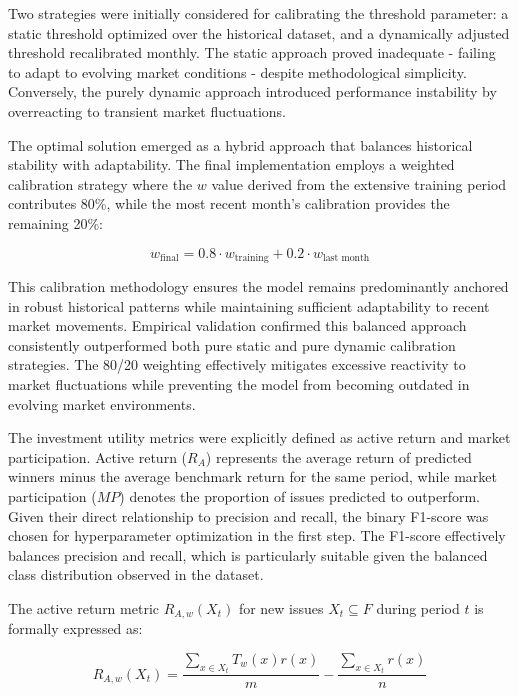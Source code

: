 Two strategies were initially considered for calibrating the threshold parameter: a static threshold optimized over the historical dataset, and a dynamically adjusted threshold recalibrated monthly. The static approach proved inadequate - failing to adapt to evolving market conditions - despite methodological simplicity. Conversely, the purely dynamic approach introduced performance instability by overreacting to transient market fluctuations.

The optimal solution emerged as a hybrid approach that balances historical stability with adaptability. The final implementation employs a weighted calibration strategy where the $w$ value derived from the extensive training period contributes 80\%, while the most recent month's calibration provides the remaining 20\%:

\begin{equation}
\label{eq: weighted_calibration}
w_{\text{final}} = 0.8 \cdot w_{\text{training}} + 0.2 \cdot w_{\text{last month}}
\end{equation}

This calibration methodology ensures the model remains predominantly anchored in robust historical patterns while maintaining sufficient adaptability to recent market movements. Empirical validation confirmed this balanced approach consistently outperformed both pure static and pure dynamic calibration strategies. The 80/20 weighting effectively mitigates excessive reactivity to  market fluctuations while preventing the model from becoming outdated in evolving market environments.

The investment utility metrics were explicitly defined as active return and market participation. Active return ($R_A$) represents the average return of predicted winners minus the average benchmark return for the same period, while market participation ($MP$) denotes the proportion of issues predicted to outperform. Given their direct relationship to precision and recall, the binary F1-score was chosen for hyperparameter optimization in the first step. The F1-score effectively balances precision and recall, which is particularly suitable given the balanced class distribution observed in the dataset.

The active return metric $R_{A,w}(X_t)$ for new issues $X_t \subseteq F$ during period $t$ is formally expressed as:

\begin{equation}
R_{A,w}(X_t) = \frac{\sum_{x \in X_t} T_w(x)r(x)}{m} - \frac{\sum_{x \in X_t} r(x)}{n}
\end{equation}

